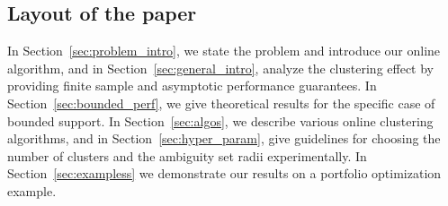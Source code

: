 \documentclass[12pt]{article}
\begin{document}
\subsection{Layout of the paper}
In Section~\ref{sec:problem_intro}, we state the problem and introduce our online algorithm, and in Section~\ref{sec:general_intro}, analyze the clustering effect by providing finite sample and asymptotic performance guarantees.
In Section~\ref{sec:bounded_perf}, we give theoretical results for the specific case of bounded support. 
In Section~\ref{sec:algos}, we describe various online clustering algorithms, and
in Section~\ref{sec:hyper_param}, give guidelines for choosing the number of clusters and the ambiguity set radii experimentally. In Section~\ref{sec:exampless} we demonstrate our results on a portfolio optimization example. 
\fi
\end{document}
